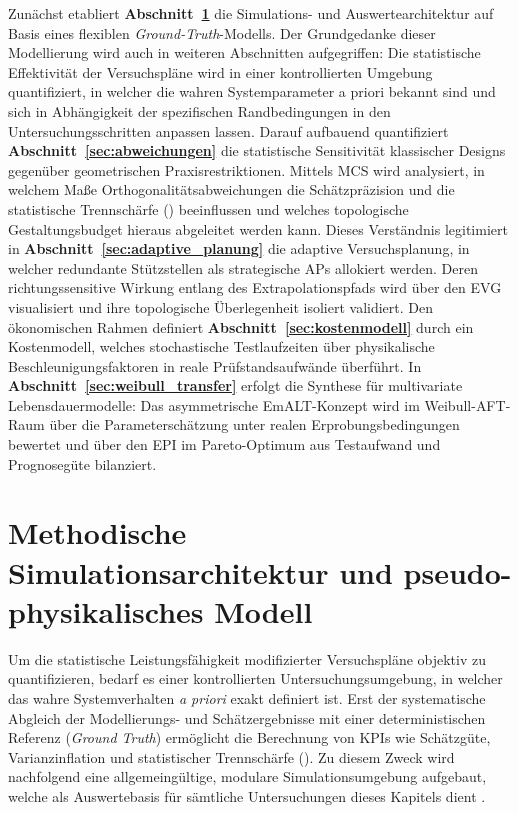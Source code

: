 Zunächst etabliert \textbf{Abschnitt~\ref{subsec:simulationsmethodik}} die Simulations- und Auswertearchitektur auf Basis eines flexiblen \textit{Ground-Truth}-Modells.
Der Grundgedanke dieser Modellierung wird auch in weiteren Abschnitten aufgegriffen: Die statistische Effektivität der Versuchspläne wird in einer kontrollierten Umgebung quantifiziert, in welcher die wahren Systemparameter a priori bekannt sind und sich in Abhängigkeit der spezifischen Randbedingungen in den Untersuchungsschritten anpassen lassen.
Darauf aufbauend quantifiziert \textbf{Abschnitt~\ref{sec:abweichungen}} die statistische Sensitivität klassischer Designs gegenüber geometrischen Praxisrestriktionen.
Mittels \ac{MCS} wird analysiert, in welchem Maße Orthogonalitätsabweichungen die Schätzpräzision und die statistische Trennschärfe () beeinflussen und welches topologische Gestaltungsbudget hieraus abgeleitet werden kann.
Dieses Verständnis legitimiert in \textbf{Abschnitt~\ref{sec:adaptive_planung}} die adaptive Versuchsplanung, in welcher redundante Stützstellen als strategische \acp{AP} allokiert werden.
Deren richtungssensitive Wirkung entlang des Extrapolationspfads wird über den \ac{EVG} visualisiert und ihre topologische Überlegenheit isoliert validiert.
Den ökonomischen Rahmen definiert \textbf{Abschnitt~\ref{sec:kostenmodell}} durch ein Kostenmodell, welches stochastische Testlaufzeiten über physikalische Beschleunigungsfaktoren in reale Prüfstandsaufwände überführt.
In \textbf{Abschnitt~\ref{sec:weibull_transfer}} erfolgt die Synthese für multivariate Lebensdauermodelle: Das asymmetrische \ac{EmALT}-Konzept wird im Weibull-\ac{AFT}-Raum über die Parameterschätzung unter realen Erprobungsbedingungen bewertet und über den \ac{EPI} im Pareto-Optimum aus Testaufwand und Prognosegüte bilanziert.

\section{Methodische Simulationsarchitektur und pseudo-physikalisches Modell} \label{subsec:simulationsmethodik}

Um die statistische Leistungsfähigkeit modifizierter Versuchspläne objektiv zu quantifizieren, bedarf es einer kontrollierten Untersuchungsumgebung, in welcher das wahre Systemverhalten \textit{a priori} exakt definiert ist.
Erst der systematische Abgleich der Modellierungs- und Schätzergebnisse mit einer deterministischen Referenz (\textit{Ground Truth}) ermöglicht die Berechnung von \acp{KPI} wie Schätzgüte, Varianzinflation und statistischer Trennschärfe ().
Zu diesem Zweck wird nachfolgend eine allgemeingültige, modulare Simulationsumgebung aufgebaut, welche als Auswertebasis für sämtliche Untersuchungen dieses Kapitels dient \cite{Arndt.2023,Arndt.2022c}.

